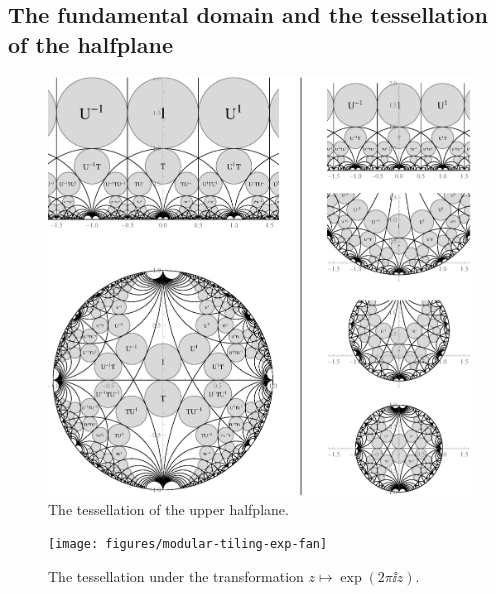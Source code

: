 \subsection{The fundamental domain and the tessellation of the halfplane}

\begin{figure}
\centering
\includegraphics[width=\textwidth]{figures/modular-tiling-1}
\caption{The tessellation of the upper halfplane.}
\label{fig_ModularTiling}
\end{figure}

\begin{figure}
\centering
\texttt{[image: figures/modular-tiling-exp-fan]}
\caption{The tessellation under the transformation $z \mapsto \exp(2 \pi \ii z)$.}
\label{fig_ModularTilingExpFan}
\end{figure}

